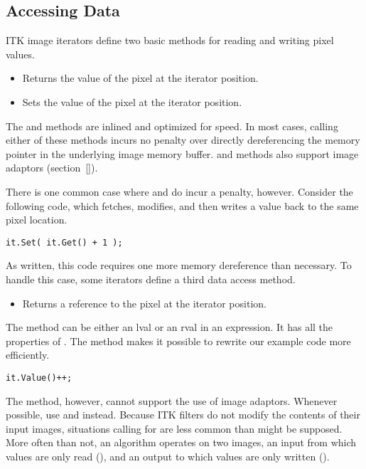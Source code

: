 \subsection{Accessing Data}
\label{sec:AccessingData}
ITK image iterators define two basic methods for reading and writing pixel
values.

\begin{itemize}
\item \textbf{} Returns the value of the pixel at the
iterator position.

\item \textbf{} Sets the value of the pixel at the
iterator position.
\end{itemize}

The  and  methods are inlined and optimized for speed. In
most cases, calling either of these methods incurs no penalty over directly
dereferencing the memory pointer in the underlying image memory buffer.
 and  methods also support image adaptors (section~\ref{}).

There is one common case where  and  do incur a penalty,
however.  Consider the following code, which fetches, modifies, and then writes
a value back to the same pixel location.

\begin{verbatim}
it.Set( it.Get() + 1 );
\end{verbatim}

As written, this code requires one more memory dereference than necessary.  To
handle this case, some iterators define a third data access method.

\begin{itemize}
\item \textbf{} Returns a reference to the pixel at
the iterator position.
\end{itemize}

The  method can be either an lval or an rval in an expression.  It
has all the properties of .  The  method makes it
possible to rewrite our example code more efficiently.

\begin{verbatim}
it.Value()++;
\end{verbatim}

The  method, however, cannot support the use of image adaptors.
Whenever possible, use  and  instead.  Because ITK filters
do not modify the contents of their input images, situations calling for
 are less common than might be supposed.  More often than not, an
algorithm operates on two images, an input from which values are only read
(), and an output to which values are only written ().


